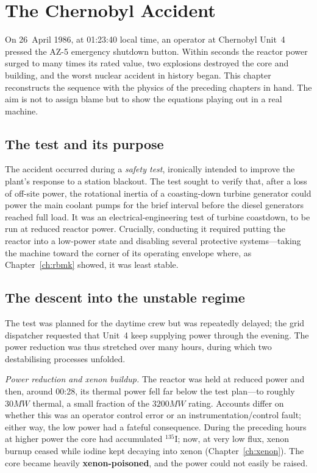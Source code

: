 \chapter{The Chernobyl Accident}
\label{ch:chernobyl}

On 26~April 1986, at 01:23:40 local time, an operator at Chernobyl Unit~4 pressed
the AZ-5 emergency shutdown button. Within seconds the reactor power surged to
many times its rated value, two explosions destroyed the core and building, and
the worst nuclear accident in history began. This chapter reconstructs the
sequence with the physics of the preceding chapters in hand. The aim is not to
assign blame but to show the equations playing out in a real machine.

\section{The test and its purpose}

The accident occurred during a \emph{safety test}, ironically intended to improve
the plant's response to a station blackout. The test sought to verify that, after a
loss of off-site power, the rotational inertia of a coasting-down turbine
generator could power the main coolant pumps for the brief interval before the
diesel generators reached full load. It was an electrical-engineering test of
turbine coastdown, to be run at reduced reactor power. Crucially, conducting it
required putting the reactor into a low-power state and disabling several
protective systems---taking the machine toward the corner of its operating
envelope where, as Chapter~\ref{ch:rbmk} showed, it was least stable.

\section{The descent into the unstable regime}

The test was planned for the daytime crew but was repeatedly delayed; the grid
dispatcher requested that Unit~4 keep supplying power through the evening. The
power reduction was thus stretched over many hours, during which two destabilising
processes unfolded.

\emph{Power reduction and xenon buildup.} The reactor was held at reduced power and
then, around 00:28, its thermal power fell far below the test plan---to roughly
$30\unit{MW}$ thermal, a small fraction of the $3200\unit{MW}$ rating. Accounts
differ on whether this was an operator control error or an instrumentation/control
fault; either way, the low power had a fateful consequence. During the preceding
hours at higher power the core had accumulated $^{135}$I; now, at very low flux,
xenon burnup ceased while iodine kept decaying into xenon
(Chapter~\ref{ch:xenon}). The core became heavily \textbf{xenon-poisoned}, and the
power could not easily be raised.

